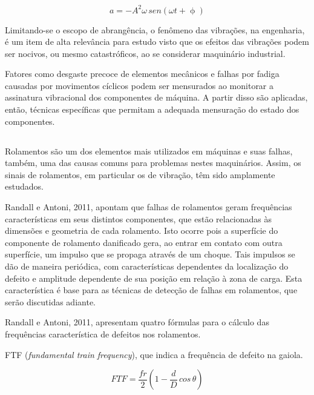 \documentclass[
	12pt,				
	oneside,			
	a4paper,			
	english,			
	brazil,	
	sumario=abnt-6027-2012		
	]{abntex2ppgsi}
\begin{document}
\begin{equation}
	a = -A^{2} \omega \,sen (\omega t + \upphi)
	\label{eq: Equação de Aceleração}
\end{equation}

Limitando-se o escopo de abrangência, o fenômeno das vibrações, na engenharia, é um item de alta relevância para estudo visto que os efeitos das vibrações podem ser nocivos, ou mesmo catastróficos, ao se considerar maquinário industrial. 

Fatores como desgaste precoce de elementos mecânicos e falhas por fadiga causadas por movimentos cíclicos podem ser mensurados ao monitorar a assinatura vibracional dos componentes de máquina. A partir disso são aplicadas, então, técnicas específicas que permitam a adequada mensuração do estado dos componentes. 

\subsection{}
\label{secao:frequenciasCaracteristicas}

Rolamentos são um dos elementos mais utilizados em máquinas e suas falhas, também, uma das causas comuns para problemas nestes maquinários. Assim, os sinais de rolamentos, em particular os de vibração, têm sido amplamente estudados. 

Randall e Antoni, 2011, apontam que falhas de rolamentos geram frequências características em seus distintos componentes, que estão relacionadas às dimensões e geometria de cada rolamento. Isto ocorre pois a superfície do componente de rolamento danificado gera, ao entrar em contato com outra superfície, um impulso que se propaga através de um choque. Tais impulsos se dão de maneira periódica, com características dependentes da localização do defeito e amplitude dependente de sua posição em relação à zona de carga. Esta característica é base para as técnicas de detecção de falhas em rolamentos, que serão discutidas adiante.


Randall e Antoni, 2011, apresentam quatro fórmulas para o cálculo das frequências característica de defeitos nos rolamentos.

FTF (\textit{fundamental train frequency}), que indica a frequência de defeito na gaiola.

\begin{equation}
	FTF = \frac{fr}{2} \left ( 1 - \frac{d}{D} \,cos \, \theta \right ) 
	\label{eq: FTF}
\end{equation}
\end{document}
